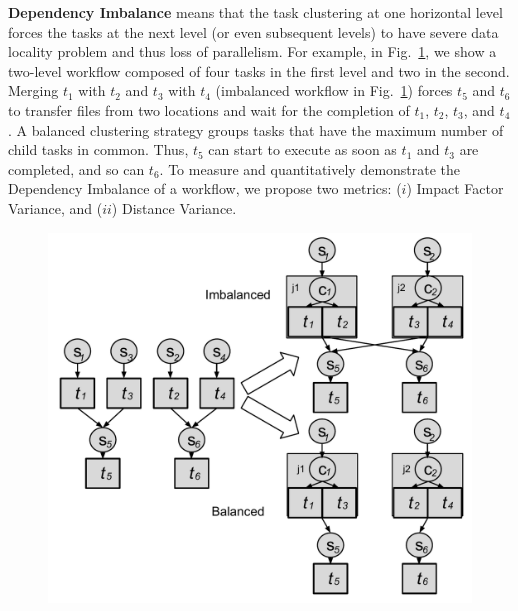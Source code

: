 \documentclass[final]{IEEEtran}
\begin{document}






\textbf{Dependency Imbalance} means that the task clustering at one horizontal level forces the tasks at the next level (or even subsequent levels) to have severe data locality problem and thus loss of parallelism. For example, in Fig.~\ref{fig:dv}, we show a two-level workflow composed of four tasks in the first level and two in the second. Merging $t_1$ with $t_2$ and $t_3$ with $t_4$ (imbalanced workflow in Fig.~\ref{fig:dv}) forces $t_5$ and $t_6$ to transfer files from two locations and wait for the completion of $t_1$, $t_2$, $t_3$, and $t_4$.  A balanced clustering strategy groups tasks that have the maximum number of child tasks in common. Thus, $t_5$ can start to execute as soon as $t_1$ and $t_3$ are completed, and so can $t_6$. To measure and quantitatively demonstrate the Dependency Imbalance of a workflow, we propose two  metrics: ($i$) Impact Factor Variance, and ($ii$) Distance Variance. 

\begin{figure}[htb]
	\centering
	\includegraphics[width=\linewidth]{figure/dv.pdf}
	\label{fig:dv}
	\vspace{-10pt}
\end{figure}
\end{document}
